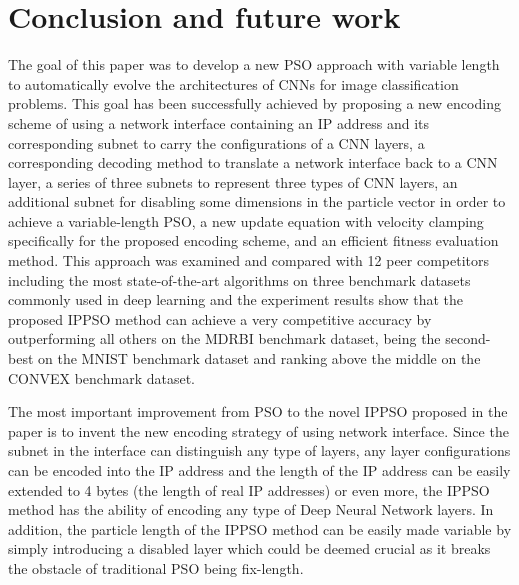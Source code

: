 \documentclass[conference]{IEEEtran}
\begin{document}




\section{Conclusion and future work}\label{sec:Conclusion}

The goal of this paper was to develop a new PSO approach with variable length to automatically evolve the architectures of CNNs for image classification problems. This goal has been successfully achieved by proposing a new encoding scheme of using a network interface containing an IP address and its corresponding subnet to carry the configurations of a CNN layers, a corresponding decoding method to translate a network interface back to a CNN layer, a series of three subnets to represent three types of CNN layers, an additional subnet for disabling some dimensions in the particle vector in order to achieve a variable-length PSO, a new update equation with velocity clamping specifically for the proposed encoding scheme, and an efficient fitness evaluation method. This approach was examined and compared with 12 peer competitors including the most state-of-the-art algorithms on three benchmark datasets commonly used in deep learning and the experiment results show that the proposed IPPSO method can achieve a very competitive accuracy by outperforming all others on the MDRBI benchmark dataset, being the second-best on the MNIST benchmark dataset and ranking above the middle on the CONVEX benchmark dataset. 

The most important improvement from PSO to the novel IPPSO proposed in the paper is to invent the new encoding strategy of using network interface. Since the subnet in the interface can distinguish any type of layers, any layer configurations can be encoded into the IP address and the length of the IP address can be easily extended to 4 bytes (the length of real IP addresses) or even more, the IPPSO method has the ability of encoding any type of Deep Neural Network layers. In addition, the particle length of the IPPSO method can be easily made variable by simply introducing a disabled layer which could be deemed crucial as it breaks the obstacle of traditional PSO being fix-length. 
\end{document}

